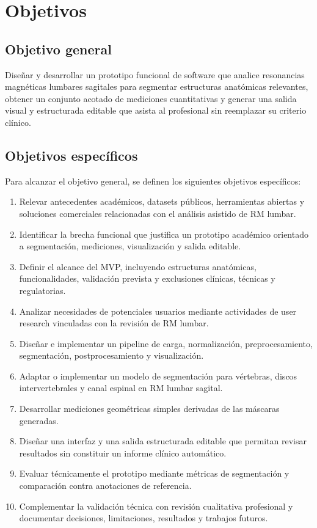 \chapter{Objetivos}

\section{Objetivo general}

Dise\~nar y desarrollar un prototipo funcional de software que analice resonancias magn\'eticas lumbares sagitales para segmentar estructuras anat\'omicas relevantes, obtener un conjunto acotado de mediciones cuantitativas y generar una salida visual y estructurada editable que asista al profesional sin reemplazar su criterio cl\'inico.

\section{Objetivos espec\'ificos}

Para alcanzar el objetivo general, se definen los siguientes objetivos espec\'ificos:

\begin{enumerate}
    \item Relevar antecedentes acad\'emicos, datasets p\'ublicos, herramientas abiertas y soluciones comerciales relacionadas con el an\'alisis asistido de RM lumbar.
    \item Identificar la brecha funcional que justifica un prototipo acad\'emico orientado a segmentaci\'on, mediciones, visualizaci\'on y salida editable.
    \item Definir el alcance del MVP, incluyendo estructuras anat\'omicas, funcionalidades, validaci\'on prevista y exclusiones cl\'inicas, t\'ecnicas y regulatorias.
    \item Analizar necesidades de potenciales usuarios mediante actividades de user research vinculadas con la revisi\'on de RM lumbar.
    \item Dise\~nar e implementar un pipeline de carga, normalizaci\'on, preprocesamiento, segmentaci\'on, postprocesamiento y visualizaci\'on.
    \item Adaptar o implementar un modelo de segmentaci\'on para v\'ertebras, discos intervertebrales y canal espinal en RM lumbar sagital.
    \item Desarrollar mediciones geom\'etricas simples derivadas de las m\'ascaras generadas.
    \item Dise\~nar una interfaz y una salida estructurada editable que permitan revisar resultados sin constituir un informe cl\'inico autom\'atico.
    \item Evaluar t\'ecnicamente el prototipo mediante m\'etricas de segmentaci\'on y comparaci\'on contra anotaciones de referencia.
    \item Complementar la validaci\'on t\'ecnica con revisi\'on cualitativa profesional y documentar decisiones, limitaciones, resultados y trabajos futuros.
\end{enumerate}
